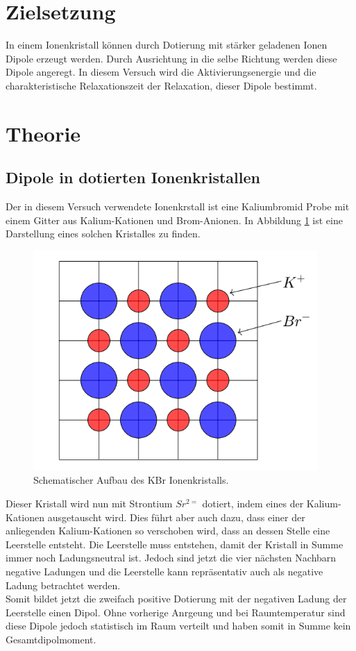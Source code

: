 \section{Zielsetzung}
In einem Ionenkristall können durch Dotierung mit stärker geladenen Ionen Dipole erzeugt werden. 
Durch Ausrichtung in die selbe Richtung werden diese Dipole angeregt.
In diesem Versuch wird die Aktivierungsenergie und die charakteristische Relaxationszeit der Relaxation, dieser Dipole bestimmt.


\section{Theorie}
	\subsection{Dipole in dotierten Ionenkristallen}
		Der in diesem Versuch verwendete Ionenkrstall ist eine Kaliumbromid Probe mit einem Gitter aus Kalium-Kationen und Brom-Anionen.
		In Abbildung \ref{fig:KBr} ist eine Darstellung eines solchen Kristalles zu finden.
		\begin{figure}
			\centering
			\includegraphics[]{latex/images/Kristall.PNG}
			\caption{Schematischer Aufbau des KBr Ionenkristalls.}
			\label{fig:KBr}
		\end{figure}
		Dieser Kristall wird nun mit Strontium $Sr^{2=}$ dotiert, indem eines der Kalium-Kationen ausgetauscht wird.
		Dies führt aber auch dazu, dass einer der anliegenden Kalium-Kationen so verschoben wird, dass an dessen Stelle eine Leerstelle entsteht.
		Die Leerstelle muss entstehen, damit der Kristall in Summe immer noch Ladungsneutral ist.
		Jedoch sind jetzt die vier nächsten Nachbarn negative Ladungen und die Leerstelle kann repräsentativ auch als negative Ladung betrachtet werden.\\
		Somit bildet jetzt die zweifach positive Dotierung mit der negativen Ladung der Leerstelle einen Dipol. 
		Ohne vorherige Anrgeung und bei Raumtemperatur sind diese Dipole jedoch statistisch im Raum verteilt und haben somit in Summe kein Gesamtdipolmoment. 

